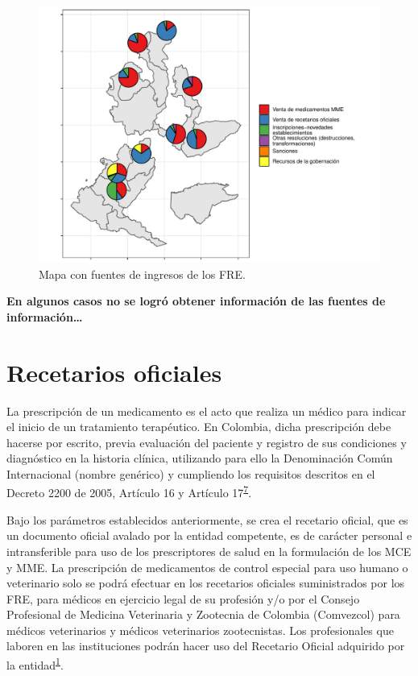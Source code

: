 \documentclass[
]{book}
\begin{document}
\begin{figure}[b]

{\centering \includegraphics[width=0.85\linewidth]{InformeFinal_files/figure-latex/IngresosFRE2-1} 

}

\caption{Mapa con fuentes de ingresos de los FRE.}\label{fig:IngresosFRE2}
\end{figure}

\textbf{En algunos casos no se logró obtener información de las fuentes de información\ldots{}}

\hypertarget{recetarios-oficiales}{%
\chapter{Recetarios oficiales}\label{recetarios-oficiales}}


La prescripción de un medicamento es el acto que realiza un médico para indicar el inicio de un tratamiento terapéutico. En Colombia, dicha prescripción debe hacerse por escrito, previa evaluación del paciente y registro de sus condiciones y diagnóstico en la historia clínica, utilizando para ello la Denominación Común Internacional (nombre genérico) y cumpliendo los requisitos descritos en el Decreto 2200 de 2005, Artículo 16 y Artículo 17\textsuperscript{\protect\hyperlink{ref-MSPS2200-2005}{7}}.

Bajo los parámetros establecidos anteriormente, se crea el recetario oficial, que es un documento oficial avalado por la entidad competente, es de carácter personal e intransferible para uso de los prescriptores de salud en la formulación de los MCE y MME. La prescripción de medicamentos de control especial para uso humano o veterinario solo se podrá efectuar en los recetarios oficiales suministrados por los FRE, para médicos en ejercicio legal de su profesión y/o por el Consejo Profesional de Medicina Veterinaria y Zootecnia de Colombia (Comvezcol) para médicos veterinarios y médicos veterinarios zootecnistas. Los profesionales que laboren en las instituciones podrán hacer uso del Recetario Oficial adquirido por la entidad\textsuperscript{\protect\hyperlink{ref-MSPS1478-2006}{1}}.
\end{document}
